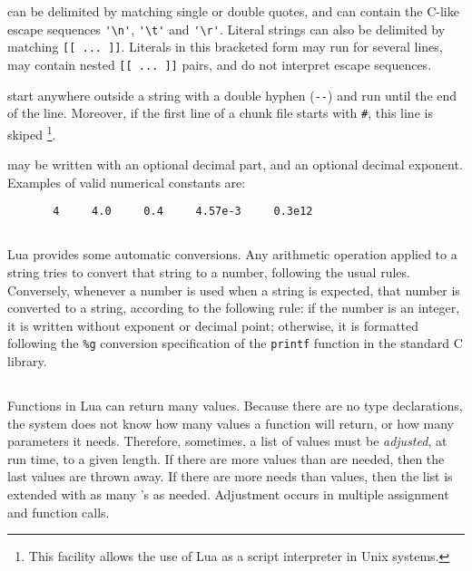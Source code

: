  can be delimited by matching single or double quotes,
and can contain the C-like escape sequences
\verb-'\n'-, \verb-'\t'- and \verb-'\r'-.
Literal strings can also be delimited by matching \verb'[[ ... ]]'.
Literals in this bracketed form may run for several lines,
may contain nested \verb'[[ ... ]]' pairs,
and do not interpret escape sequences.

 start anywhere outside a string with a
double hyphen (\verb'--') and run until the end of the line.
Moreover, if the first line of a chunk file starts with \verb'#',
this line is skiped%
\footnote{This facility allows the use of Lua as a script interpreter
in Unix systems.}.

 may be written with an optional decimal part,
and an optional decimal exponent.
Examples of valid numerical constants are:
\begin{verbatim}
       4     4.0     0.4     4.57e-3     0.3e12
\end{verbatim}


\subsection{} \label{coercion}

Lua provides some automatic conversions.
Any arithmetic operation applied to a string tries to convert
that string to a number, following the usual rules.
Conversely, whenever a number is used when a string is expected,
that number is converted to a string, according to the following rule:
if the number is an integer, it is written without exponent or decimal point;
otherwise, it is formatted following the \verb'%g'
conversion specification of the \verb'printf' function in the
standard C library.



\subsection{} \label{adjust}

Functions in Lua can return many values.
Because there are no type declarations,
the system does not know how many values a function will return,
or how many parameters it needs.
Therefore, sometimes, a list of values must be {\em adjusted\/}, at run time,
to a given length.
If there are more values than are needed, then the last values are thrown away.
If there are more needs than values, then the list is extended with as
many  \nil's as needed.
Adjustment occurs in multiple assignment and function calls.


